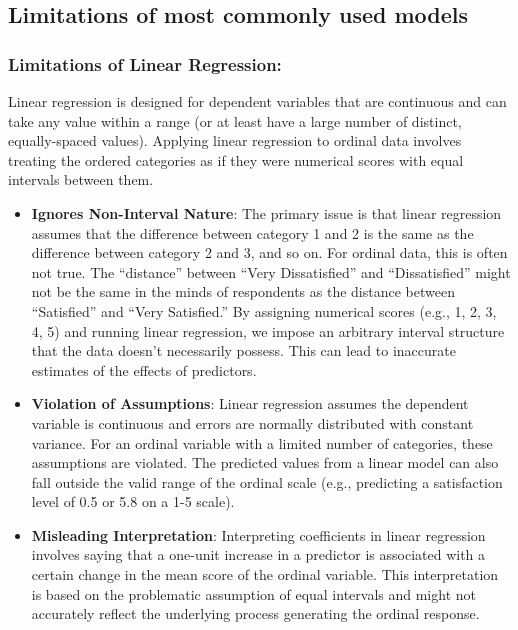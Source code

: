 \documentclass[
  letterpaper,
  DIV=11,
  numbers=noendperiod]{scrartcl}
\begin{document}
\hypertarget{limitations-of-most-commonly-used-models}{%
\subsection{Limitations of most commonly used
models}\label{limitations-of-most-commonly-used-models}}

\hypertarget{limitations-of-linear-regression}{%
\subsubsection*{Limitations of Linear
Regression:}\label{limitations-of-linear-regression}}

Linear regression is designed for dependent variables that are
continuous and can take any value within a range (or at least have a
large number of distinct, equally-spaced values). Applying linear
regression to ordinal data involves treating the ordered categories as
if they were numerical scores with equal intervals between them.

\begin{itemize}
\item
  \textbf{Ignores Non-Interval Nature}: The primary issue is that linear
  regression assumes that the difference between category 1 and 2 is the
  same as the difference between category 2 and 3, and so on. For
  ordinal data, this is often not true. The ``distance'' between ``Very
  Dissatisfied'' and ``Dissatisfied'' might not be the same in the minds
  of respondents as the distance between ``Satisfied'' and ``Very
  Satisfied.'' By assigning numerical scores (e.g., 1, 2, 3, 4, 5) and
  running linear regression, we impose an arbitrary interval structure
  that the data doesn't necessarily possess. This can lead to inaccurate
  estimates of the effects of predictors.
\item
  \textbf{Violation of Assumptions}: Linear regression assumes the
  dependent variable is continuous and errors are normally distributed
  with constant variance. For an ordinal variable with a limited number
  of categories, these assumptions are violated. The predicted values
  from a linear model can also fall outside the valid range of the
  ordinal scale (e.g., predicting a satisfaction level of 0.5 or 5.8 on
  a 1-5 scale).
\item
  \textbf{Misleading Interpretation}: Interpreting coefficients in
  linear regression involves saying that a one-unit increase in a
  predictor is associated with a certain change in the mean score of the
  ordinal variable. This interpretation is based on the problematic
  assumption of equal intervals and might not accurately reflect the
  underlying process generating the ordinal response.
\end{itemize}
\end{document}

